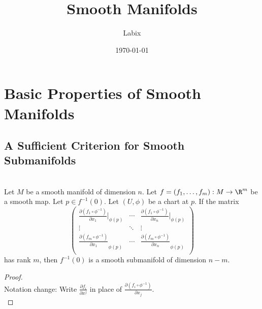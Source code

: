 \documentclass[a4paper]{article}
\title{Smooth Manifolds}
\author{Labix}
\date{\today}
\begin{document}
\maketitle
\begin{abstract}
\end{abstract}
\pagebreak
\tableofcontents

\pagebreak
\section{Basic Properties of Smooth Manifolds}
\subsection{A Sufficient Criterion for Smooth Submanifolds}
\begin{prp}{}{}\\
Let $M$ be a smooth manifold of dimension $n$. Let $f=(f_1,\dots,f_m):M\to\R^m$ be a smooth map. Let $p\in f^{-1}(0)$. Let $(U,\phi)$ be a chart at $p$. If the matrix $$\begin{pmatrix}
\frac{\partial(f_1\circ\phi^{-1})}{\partial x_1}|_{\phi(p)} & \cdots & \frac{\partial(f_1\circ\phi^{-1})}{\partial x_n}|_{\phi(p)}\\
\vdots & \ddots & \vdots\\
\frac{\partial(f_m\circ\phi^{-1})}{\partial x_1}_{\phi(p)} & \cdots & \frac{\partial(f_m\circ\phi^{-1})}{\partial x_n}_{\phi(p)}\\
\end{pmatrix}$$ has rank $m$, then $f^{-1}(0)$ is a smooth submanifold of dimension $n-m$. 
\begin{proof}\\
Notation change: Write $\frac{\partial f_i}{\partial x^j}$ in place of $\frac{\partial(f_i\circ\phi^{-1})}{\partial x_j}$. \\
 

\end{proof}
\end{prp}
\end{document}
